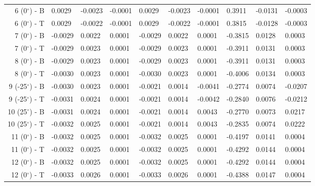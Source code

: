 \begin{table}[H]
\begin{longtable}{rlllllllll}
   6 (0$^\circ$) - B &        0.0029 &       -0.0023 &       -0.0001 &        0.0029 &       -0.0023 &       -0.0001 &      0.3911 &     -0.0131 &     -0.0003 \\
   6 (0$^\circ$) - T &        0.0029 &       -0.0022 &       -0.0001 &        0.0029 &       -0.0022 &       -0.0001 &      0.3815 &     -0.0128 &     -0.0003 \\\midrule
   7 (0$^\circ$) - B &       -0.0029 &        0.0022 &        0.0001 &       -0.0029 &        0.0022 &        0.0001 &     -0.3815 &      0.0128 &      0.0003 \\
   7 (0$^\circ$) - T &       -0.0029 &        0.0023 &        0.0001 &       -0.0029 &        0.0023 &        0.0001 &     -0.3911 &      0.0131 &      0.0003 \\\midrule
   8 (0$^\circ$) - B &       -0.0029 &        0.0023 &        0.0001 &       -0.0029 &        0.0023 &        0.0001 &     -0.3911 &      0.0131 &      0.0003 \\
   8 (0$^\circ$) - T &       -0.0030 &        0.0023 &        0.0001 &       -0.0030 &        0.0023 &        0.0001 &     -0.4006 &      0.0134 &      0.0003 \\\midrule
 9 (-25$^\circ$) - B &       -0.0030 &        0.0023 &        0.0001 &       -0.0021 &        0.0014 &       -0.0041 &     -0.2774 &      0.0074 &     -0.0207 \\
 9 (-25$^\circ$) - T &       -0.0031 &        0.0024 &        0.0001 &       -0.0021 &        0.0014 &       -0.0042 &     -0.2840 &      0.0076 &     -0.0212 \\\midrule
 10 (25$^\circ$) - B &       -0.0031 &        0.0024 &        0.0001 &       -0.0021 &        0.0014 &        0.0043 &     -0.2770 &      0.0073 &      0.0217 \\
 10 (25$^\circ$) - T &       -0.0032 &        0.0025 &        0.0001 &       -0.0021 &        0.0014 &        0.0043 &     -0.2835 &      0.0074 &      0.0222 \\\midrule
  11 (0$^\circ$) - B &       -0.0032 &        0.0025 &        0.0001 &       -0.0032 &        0.0025 &        0.0001 &     -0.4197 &      0.0141 &      0.0004 \\
  11 (0$^\circ$) - T &       -0.0032 &        0.0025 &        0.0001 &       -0.0032 &        0.0025 &        0.0001 &     -0.4292 &      0.0144 &      0.0004 \\\midrule
  12 (0$^\circ$) - B &       -0.0032 &        0.0025 &        0.0001 &       -0.0032 &        0.0025 &        0.0001 &     -0.4292 &      0.0144 &      0.0004 \\
  12 (0$^\circ$) - T &       -0.0033 &        0.0026 &        0.0001 &       -0.0033 &        0.0026 &        0.0001 &     -0.4388 &      0.0147 &      0.0004 \\\midrule
\end{longtable}
\end{table}